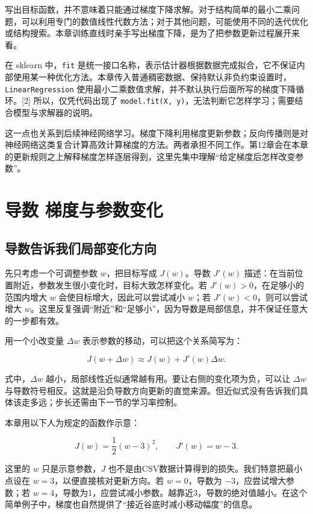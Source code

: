 写出目标函数，并不意味着只能通过梯度下降求解。对于结构简单的最小二乘问题，可以利用专门的数值线性代数方法；对于其他问题，可能使用不同的迭代优化或结构搜索。本章训练直线时亲手写出梯度下降，是为了把参数更新过程展开来看。

在 sklearn 中，\texttt{fit} 是统一接口名称，表示估计器根据数据完成拟合，它不保证内部使用某一种优化方法。本章传入普通稠密数据、保持默认非负约束设置时，\texttt{LinearRegression} 使用最小二乘数值求解，并不默认执行后面所写的梯度下降循环。{[}2{]} 所以，仅凭代码出现了 \texttt{model.fit(X,\ y)}，无法判断它怎样学习；需要结合模型与求解器的说明。

这一点也关系到后续神经网络学习。梯度下降利用梯度更新参数；反向传播则是对神经网络这类复合计算高效计算梯度的方法。两者承担不同工作。第12章会在本章的更新规则之上解释梯度怎样逐层得到，这里先集中理解``给定梯度后怎样改变参数''。

\section{导数 梯度与参数变化}

\subsection{导数告诉我们局部变化方向}

先只考虑一个可调整参数 \(w\)，把目标写成 \(J(w)\)。导数 \(J'(w)\) 描述：在当前位置附近，参数发生很小变化时，目标大致怎样变化。若 \(J'(w) > 0\)，在足够小的范围内增大 \(w\) 会使目标增大，因此可以尝试减小 \(w\)；若 \(J'(w) < 0\)，则可以尝试增大 \(w\)。这里反复强调``附近''和``足够小''，因为导数是局部信息，并不保证任意大的一步都有效。

用一个小改变量 \(\Delta w\) 表示参数的移动，可以把这个关系简写为：

\[J(w + \Delta w) \approx J(w) + J'(w)\Delta w.\]

式中，\(\Delta w\) 越小，局部线性近似通常越有用。要让右侧的变化项为负，可以让 \(\Delta w\) 与导数符号相反。这就是沿负导数方向更新的直觉来源。但近似式没有告诉我们具体该走多远；步长还需由下一节的学习率控制。

本章用以下人为规定的函数作示意：

\[J(w) = \frac{1}{2}(w - 3)^{2},\quad\quad J'(w) = w - 3.\]

这里的 \(w\) 只是示意参数，\(J\) 也不是由CSV数据计算得到的损失。我们特意把最小点设在 \(w = 3\)，以便直接核对更新方向。若 \(w = 0\)，导数为 \(- 3\)，应尝试增大参数；若 \(w = 4\)，导数为1，应尝试减小参数。越靠近3，导数的绝对值越小。在这个简单例子中，梯度也自然提供了``接近谷底时减小移动幅度''的信息。

